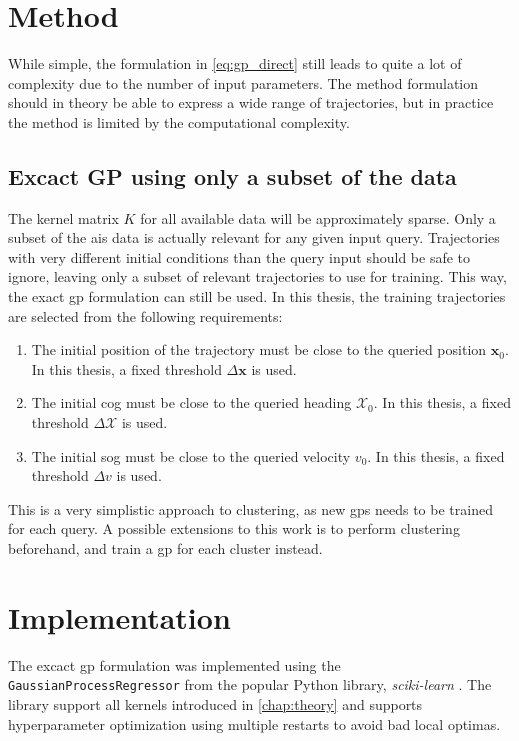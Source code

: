\section{Method}
While simple, the formulation in \cref{eq:gp_direct} still leads to quite a lot of complexity due to the number of input parameters. The method formulation should in theory be able to express a wide range of trajectories, but in practice the method is limited by the computational complexity.

\subsection{Excact GP using only a subset of the data}
The kernel matrix $K$ for all available data will be approximately sparse. Only a subset of the \acrshort{ais} data is actually relevant for any given input query. Trajectories with very different initial conditions than the query input should be safe to ignore, leaving only a subset of relevant trajectories to use for training. This way, the exact \acrshort{gp} formulation can still be used.
In this thesis, the training trajectories are selected from the following requirements:
\begin{enumerate}
    \item The initial position of the trajectory must be close to the queried position $\boldsymbol{x}_0$. In this thesis, a fixed threshold $\Delta \boldsymbol{x}$ is used.
    \item The initial \acrshort{cog} must be close to the queried heading $\mathcal{X}_0$. In this thesis, a fixed threshold $\Delta \mathcal{X}$ is used. 
    \item The initial \acrshort{sog} must be close to the queried velocity $v_0$. In this thesis, a fixed threshold $\Delta v$ is used.
\end{enumerate} 

This is a very simplistic approach to clustering, as new \acrshort{gp}s needs to be trained for each query. A possible extensions to this work is to perform clustering beforehand, and train a \acrshort{gp} for each cluster instead. 

\section{Implementation}
The excact \acrshort{gp} formulation was implemented using the \texttt{GaussianProcessRegressor} from the popular Python library, \textit{sciki-learn} \cite{scikit-learn}. The library support all kernels introduced in \cref{chap:theory} and supports hyperparameter optimization using multiple restarts to avoid bad local optimas. 

